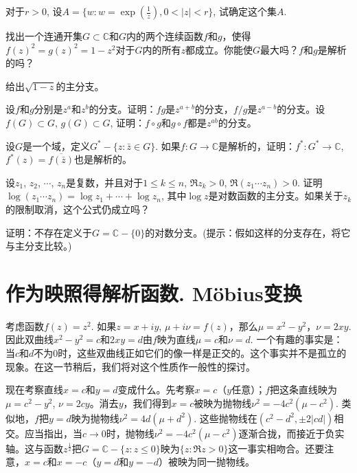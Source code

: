 \begin{problemset}
\item 对于$r > 0$, 设$A = \{w: w = \exp{(\frac{1}{z})}, 0 < |z| < r\}$, 试确定这个集$A$. 

\item 找出一个连通开集$G \subset \mathbb{C}$和$G$内的两个连续函数$f$和$g$，使得$f(z)^2 = g(z)^2 = 1 - z^2$对于$G$内的所有$z$都成立。你能使$G$最大吗？$f$和$g$是解析的吗？ 

\item 给出$\sqrt{1-z}$的主分支。

\item 设$f$和$g$分别是$z^a$和$z^b$的分支。证明：$fg$是$z^{a+b}$的分支，$f/g$是$z^{a-b}$的分支。设$f(G) \subset G$, $g(G) \subset G$, 证明：$f \circ g$和$g \circ f$都是$z^{ab}$的分支。

\item 设$G$是一个域，定义$G^* - \{z: \bar{z} \in G\}$. 如果$f: G \to \mathbb{C}$是解析的，证明：$f^*: G^* \to \mathbb{C}$, $f^*(z) = \overline{f(\bar{z})}$也是解析的。

\item 设$z_1$, $z_2$, $\cdots$, $z_n$是复数，并且对于$1 \le k \le n$, $\Re{z_k} > 0$, $\Re{(z_1\cdots{}z_n)} > 0$. 证明$\log{(z_1\cdots{}z_n)} = \log{z_1} + \cdots + \log{z_n}$, 其中$\log{z}$是对数函数的主分支。如果关于$z_k$的限制取消，这个公式仍成立吗？

\item\label{exer002030221}证明：不存在定义于$G = \mathbb{C} - \{0\}$的对数分支。(提示：假如这样的分支存在，将它与主分支比较。)
\end{problemset}


\section{作为映照得解析函数. M\"{o}bius变换}\label{section0020303}
考虑函数$f(z)=z^2$. 如果$z = x+iy$, $\mu + i\nu = f(z)$，那么$\mu = x^2 - y^2$，$\nu = 2xy$. 因此双曲线$x^2 - y^2= c$和$2xy = d$由$f$映为直线$\mu = c$和$\nu = d$. 一个有趣的事实是：当$c$和$d$不为0时，这些双曲线正如它们的像一样是正交的。这个事实并不是孤立的现象。在这一节稍后，我们将对这个性质作一般性的探讨。

现在考察直线$x=c$和$y=d$变成什么。先考察$x=c$（$y$任意）；$f$把这条直线映为$\mu = c^2 - y^2$, $\nu = 2cy$。消去$y$，我们得到$x=c$被映为抛物线$\nu^2 = -4c^2(\mu - c^2)$. 类似地，$f$把$y=d$映为抛物线$\nu^2 = 4d(\mu + d^2)$. 这些抛物线在$(c^2 - d^2, \pm{}2|cd|)$相交。应当指出，当$c \to 0$时，抛物线$\nu^2 = -4c^2(\mu - c^2)$逐渐合拢，而接近于负实轴。这与函数$z^{\frac{1}{2}}$把$G = \mathbb{C} - \{z:z \le 0\}$映为$\{z:\Re{z}>0\}$这一事实相吻合。还要注意，$x=c$和$x=-c$（$y=d$和$y=-d$）被映为同一抛物线。

